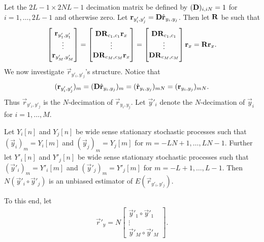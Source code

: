 \documentclass[a4paper, openany, oneside]{memoir}
\begin{document}
Let the $2L-1\times 2NL-1$ decimation matrix be defined by $(\boldsymbol{\mathbf{D}})_{i,iN} = 1$ for $i=1,\ldots,2L-1$ and otherwise zero. Let $\boldsymbol{\mathbf{r}}_{y'_i,y'_j} = \boldsymbol{\mathbf{D}} \hat{\boldsymbol{\mathbf{r}}}_{y_i,y_j}$. Then let $\boldsymbol{\mathbf{R}}$ be such that
\begin{align*}
    \begin{bmatrix}
        \boldsymbol{\mathbf{r}}_{y'_1,y'_1} \\
        \vdots \\
        \boldsymbol{\mathbf{r}}_{y'_M,y'_M}
    \end{bmatrix}
    = \begin{bmatrix}
        \boldsymbol{\mathbf{D}}\boldsymbol{\mathbf{R}}_{c_1,c_1} \boldsymbol{\mathbf{r}}_x \\
        \vdots \\
        \boldsymbol{\mathbf{D}}\boldsymbol{\mathbf{R}}_{c_M,c_M} \boldsymbol{\mathbf{r}}_x
    \end{bmatrix}
    = \begin{bmatrix}
        \boldsymbol{\mathbf{D}}\boldsymbol{\mathbf{R}}_{c_1,c_1}\\
        \vdots \\
        \boldsymbol{\mathbf{D}}\boldsymbol{\mathbf{R}}_{c_M,c_M}
    \end{bmatrix} \boldsymbol{\mathbf{r}}_x
    = \boldsymbol{\mathbf{R}} \boldsymbol{\mathbf{r}}_x.
\end{align*}
We now investigate $\vec{r}_{y'_i,y'_j}$'s structure. Notice that
\begin{align*}
    (\boldsymbol{\mathbf{r}}_{y'_i,y'_j})_m = (\boldsymbol{\mathbf{D}} \hat{\boldsymbol{\mathbf{r}}}_{y_i,y_j})_{m} = (\hat{\boldsymbol{\mathbf{r}}}_{y_i,y_j})_{mN} = (\boldsymbol{\mathbf{r}}_{y_i,y_j})_{mN}.
\end{align*}
Thus $\vec{r}_{y'_i,y'_j}$ is the $N$-decimation of $\vec{r}_{y_i,y_j}$. Let $\vec{y}'_i$ denote the $N$-decimation of $\vec{y}_i$ for $i = 1, \ldots, M$.
\begin{theorem} \label{th:deci-corr}
    Let $Y_i[n]$ and $Y_j[n]$ be wide sense stationary stochastic processes such that $(\vec{y}_i)_m = Y_i[m]$ and $(\vec{y}_j)_m = Y_j[m]$ for $m=-LN+1,\ldots,LN-1$. Further let $Y'_i[n]$ and $Y'_j[n]$ be wide sense stationary stochastic processes such that $(\vec{y}'_i)_m = Y'_i[m]$ and $(\vec{y}'_j)_m = Y'_j[m]$ for $m=-L+1,\ldots,L-1$. Then $N(\vec{y}'_i \circ \vec{y}'_j)$ is an unbiased estimator of $E(\vec{r}_{y'_i,y'_j})$.
\end{theorem}
To this end, let
\begin{align*}
    \vec{r}'_y = N \begin{bmatrix}
        \vec{y}'_1 \circ \vec{y}'_1 \\
        \vdots \\
        \vec{y}'_M \circ \vec{y}'_M
    \end{bmatrix}.
\end{align*}
\end{document}
